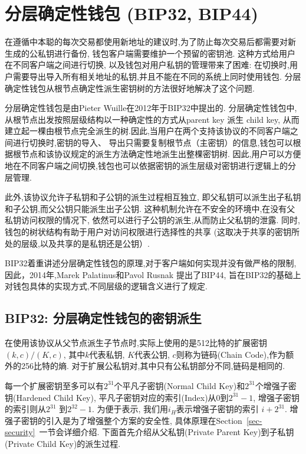 \section{分层确定性钱包 (BIP32, BIP44)}

在遵循中本聪的每次交易都使用新地址的建议时,为了防止每次交易后都需要对新生成的公私钥进行备份,
钱包客户端需要维护一个预留的密钥池. 这种方式给用户在不同客户端之间进行切换, 以及钱包对用户私钥的管理带来了困难:
在切换时,用户需要导出导入所有相关地址的私钥,并且不能在不同的系统上同时使用钱包.
分层确定性钱包从根节点确定性派生密钥树的方法很好地解决了这个问题.

分层确定性钱包是由Pieter Wuille在2012年于BIP32中提出的.
分层确定性钱包中, 从根节点出发按照层级结构以一种确定性的方式从parent key 派生 child key,
从而建立起一棵由根节点完全派生的树.因此,当用户在两个支持该协议的不同客户端之间进行切换时,密钥的导入、
导出只需要复制根节点（主密钥）的信息,钱包可以根据根节点和该协议规定的派生方法确定性地派生出整棵密钥树.
因此,用户可以方便地在不同客户端之间切换,钱包也可以依据密钥的派生层级对密钥进行逻辑上的分层管理.
  
此外,该协议允许子私钥和子公钥的派生过程相互独立,
即父私钥可以派生出子私钥和子公钥,而父公钥只能派生出子公钥.
这种机制允许在不安全的环境中,在没有父私钥访问权限的情况下,
依然可以进行子公钥的派生,从而防止父私钥的泄露.
同时,钱包的树状结构有助于用户对访问权限进行选择性的共享
(这取决于共享的密钥所处的层级,以及共享的是私钥还是公钥）.  

BIP32着重讲述分层确定性钱包的原理,对于客户端如何实现并没有做严格的限制,
因此，2014年,Marek Palatinus和Pavol Rusnak 
提出了BIP44, 旨在BIP32的基础上对钱包具体的实现方式,不同层级的逻辑含义进行了规定.

\subsection{BIP32: 分层确定性钱包的密钥派生}

在使用该协议从父节点派生子节点时,实际上使用的是512比特的扩展密钥$(k,c)/(K,c)$,
其中$k$代表私钥, $K$代表公钥, $c$则称为链码(Chain Code),作为额外的256比特的熵.
对于扩展公私钥对,其中只有公私钥部分不同,链码是相同的.
 
每一个扩展密钥至多可以有$2^{31}$个平凡子密钥(Normal Child Key)和$2^{31}$个增强子密钥(Hardened Child Key), 
平凡子密钥对应的索引(Index)从0到$2^{31}-1$, 增强子密钥的索引则从$2^{31}$ 到$2^{32}-1$.
为便于表示, 我们用$i_H$表示增强子密钥的索引 $i+2^{31}$. 增强子密钥的引入是为了增强整个方案的安全性,
具体原理在Section~\ref{sec-security}~一节会详细介绍. 
下面首先介绍从父私钥(Private Parent Key)到子私钥(Private Child Key)的派生过程.

